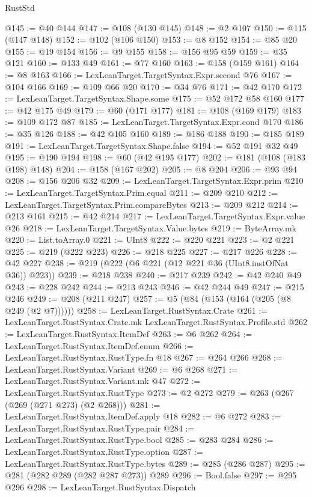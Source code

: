 \begin{lexlean}{RustStd}
\begin{coremodule}
{\begin{coremodule}
{{{{{{{{{@145 := @40 @144
@147 := @108 (@130 @145)
@148 := @2 @107
@150 := @115 (@147 @148)
@152 := @102 (@106 @150)
@153 := @8 @152
@154 := @85 @20
@155 := @19 @154
@156 := @9 @155
@158 := @156 @95 @59
@159 := @35 @121
@160 := @133 @49
@161 := @77 @160
@163 := @158 (@159 @161)
@164 := @8 @163
@166 := LexLeanTarget.TargetSyntax.Expr.second @76
@167 := @104 @166
@169 := @109 @66 @20
@170 := @34 @76
@171 := @42 @170
@172 := LexLeanTarget.TargetSyntax.Shape.some
@175 := @52 @172 @58 @160
@177 := @42 @175 @49
@179 := @60 (@171 @177)
@181 := @108 (@169 @179)
@183 := @109 @172 @87
@185 := LexLeanTarget.TargetSyntax.Expr.cond @170
@186 := @35 @126
@188 := @42 @105 @160
@189 := @186 @188
@190 := @185 @189
@191 := LexLeanTarget.TargetSyntax.Shape.false
@194 := @52 @191 @32 @49
@195 := @190 @194
@198 := @60 (@42 @195 @177)
@202 := @181 (@108 (@183 @198) @148)
@204 := @158 (@167 @202)
@205 := @8 @204
@206 := @93 @94
@208 := @156 @206 @32
@209 := LexLeanTarget.TargetSyntax.Expr.prim
@210 := LexLeanTarget.TargetSyntax.Prim.equal
@211 := @209 @210
@212 := LexLeanTarget.TargetSyntax.Prim.compareBytes
@213 := @209 @212
@214 := @213 @161
@215 := @42 @214
@217 := LexLeanTarget.TargetSyntax.Expr.value @26
@218 := LexLeanTarget.TargetSyntax.Value.bytes
@219 := ByteArray.mk
@220 := List.toArray.{0}
@221 := UInt8
@222 := @220 @221
@223 := @2 @221
@225 := @219 (@222 @223)
@226 := @218 @225
@227 := @217 @226
@228 := @42 @227
@238 := @219 (@222 (@6 @221 (@12 @221 @36 (UInt8.instOfNat @36)) @223))
@239 := @218 @238
@240 := @217 @239
@242 := @42 @240 @49
@243 := @228 @242
@244 := @213 @243
@246 := @42 @244 @49
@247 := @215 @246
@249 := @208 (@211 @247)
@257 := @5 (@84 (@153 (@164 (@205 (@8 @249 (@2 @7))))))
@258 := LexLeanTarget.RustSyntax.Crate
@261 := LexLeanTarget.RustSyntax.Crate.mk LexLeanTarget.RustSyntax.Profile.std
@262 := LexLeanTarget.RustSyntax.ItemDef
@263 := @6 @262
@264 := LexLeanTarget.RustSyntax.ItemDef.enum
@266 := LexLeanTarget.RustSyntax.RustType.fn @18
@267 := @264 @266
@268 := LexLeanTarget.RustSyntax.Variant
@269 := @6 @268
@271 := LexLeanTarget.RustSyntax.Variant.mk @47
@272 := LexLeanTarget.RustSyntax.RustType
@273 := @2 @272
@279 := @263 (@267 (@269 (@271 @273) (@2 @268)))
@281 := LexLeanTarget.RustSyntax.ItemDef.apply @18
@282 := @6 @272
@283 := LexLeanTarget.RustSyntax.RustType.pair
@284 := LexLeanTarget.RustSyntax.RustType.bool
@285 := @283 @284
@286 := LexLeanTarget.RustSyntax.RustType.option
@287 := LexLeanTarget.RustSyntax.RustType.bytes
@289 := @285 (@286 @287)
@295 := @281 (@282 @289 (@282 @287 @273)) @289
@296 := Bool.false
@297 := @295 @296
@298 := LexLeanTarget.RustSyntax.Dispatch
}}}}}}}}}
\end{coremodule}}
\end{coremodule}
\end{lexlean}
